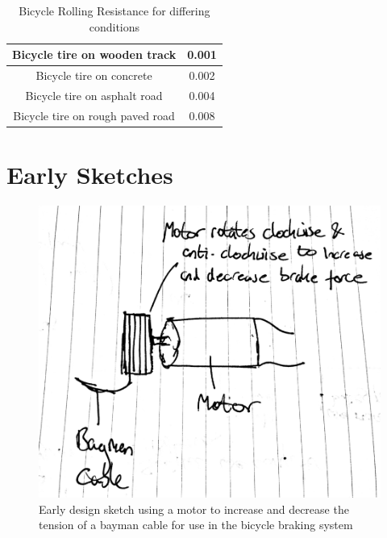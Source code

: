 \documentclass[a4paper]{report}
\begin{document}
{\begin{table}[h]
\begin{tabular}{ | c | c |}
   Bicycle tire on wooden track & 0.001   \\ \hline
   Bicycle tire on concrete & 0.002 \\ \hline
  Bicycle tire on asphalt road & 0.004 \\ \hline
  Bicycle tire on rough paved road & 0.008 \\ \hline

  \end{tabular}

\caption[Table caption text]{Bicycle Rolling Resistance for differing conditions \cite{cite:bicycle_friction}} 
\label{table:bicycle_friction}
\end{table}

\section{Early Sketches}
\label{app:early_sketches}

\begin{figure}[h]
\centering
\includegraphics[scale=0.25]{figures/early_sketches/braking_system/motor_cable_tension}
\caption{Early design sketch using a motor to increase and decrease the tension of a bayman cable for use in the bicycle braking system}
\label{fig:early_motor_cable_tension}
\end{figure}

}
\end{document}
